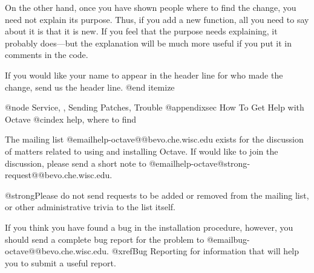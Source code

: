 On the other hand, once you have shown people where to find the change,
you need not explain its purpose. Thus, if you add a new function, all
you need to say about it is that it is new.  If you feel that the
purpose needs explaining, it probably does---but the explanation will be
much more useful if you put it in comments in the code.

If you would like your name to appear in the header line for who made
the change, send us the header line.
@end itemize

@node Service,  , Sending Patches, Trouble
@appendixsec How To Get Help with Octave
@cindex help, where to find

The mailing list @email{help-octave@@bevo.che.wisc.edu} exists for the
discussion of matters related to using and installing Octave.  If would
like to join the discussion, please send a short note to
@email{help-octave@strong{-request}@@bevo.che.wisc.edu}.

@strong{Please do not} send requests to be added or removed from the
mailing list, or other administrative trivia to the list itself.

If you think you have found a bug in the installation procedure,
however, you should send a complete bug report for the problem to
@email{bug-octave@@bevo.che.wisc.edu}.  @xref{Bug Reporting} for
information that will help you to submit a useful report.
